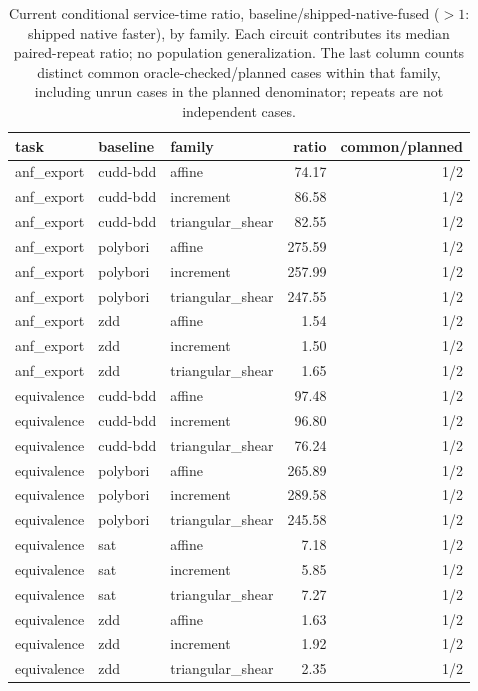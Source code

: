 \begin{table}[tbp]
\centering\scriptsize
\setlength{\tabcolsep}{3pt}
\caption{Current conditional service-time ratio, baseline/shipped-native-fused ($>1$: shipped native faster), by family. Each circuit contributes its median paired-repeat ratio; no population generalization. The last column counts distinct common oracle-checked/planned cases within that family, including unrun cases in the planned denominator; repeats are not independent cases.}
\label{tab:current-families}
\begin{tabular}{lllrr}
\toprule
task & baseline & family & ratio & common/planned \\
\midrule
anf\_export & cudd-bdd & affine & 74.17 & 1/2 \\
anf\_export & cudd-bdd & increment & 86.58 & 1/2 \\
anf\_export & cudd-bdd & triangular\_shear & 82.55 & 1/2 \\
anf\_export & polybori & affine & 275.59 & 1/2 \\
anf\_export & polybori & increment & 257.99 & 1/2 \\
anf\_export & polybori & triangular\_shear & 247.55 & 1/2 \\
anf\_export & zdd & affine & 1.54 & 1/2 \\
anf\_export & zdd & increment & 1.50 & 1/2 \\
anf\_export & zdd & triangular\_shear & 1.65 & 1/2 \\
equivalence & cudd-bdd & affine & 97.48 & 1/2 \\
equivalence & cudd-bdd & increment & 96.80 & 1/2 \\
equivalence & cudd-bdd & triangular\_shear & 76.24 & 1/2 \\
equivalence & polybori & affine & 265.89 & 1/2 \\
equivalence & polybori & increment & 289.58 & 1/2 \\
equivalence & polybori & triangular\_shear & 245.58 & 1/2 \\
equivalence & sat & affine & 7.18 & 1/2 \\
equivalence & sat & increment & 5.85 & 1/2 \\
equivalence & sat & triangular\_shear & 7.27 & 1/2 \\
equivalence & zdd & affine & 1.63 & 1/2 \\
equivalence & zdd & increment & 1.92 & 1/2 \\
equivalence & zdd & triangular\_shear & 2.35 & 1/2 \\
\bottomrule
\end{tabular}
\end{table}

